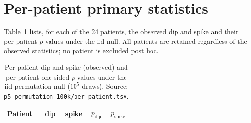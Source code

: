 \documentclass[11pt,twocolumn]{article}
\begin{document}
\appendix

\section{Per-patient primary statistics}\label{app:perpatient}
Table~\ref{tab:perpatient} lists, for each of the 24 patients,
the observed dip and spike and their per-patient $p$-values
under the iid null. All patients are retained regardless of
the observed statistics; no patient is excluded post hoc.

\begin{table}[h]
\centering\small
\begin{tabular}{@{}lrrrr@{}}
\toprule
Patient & dip & spike & $p_{\mathrm{dip}}$ & $p_{\mathrm{spike}}$ \\
\midrule

\bottomrule
\end{tabular}
\caption{Per-patient dip and spike (observed) and per-patient
one-sided $p$-values under the iid permutation null
($10^5$ draws). Source:
\texttt{p5\_permutation\_100k/per\_patient.tsv}.}
\label{tab:perpatient}
\end{table}
\end{document}
